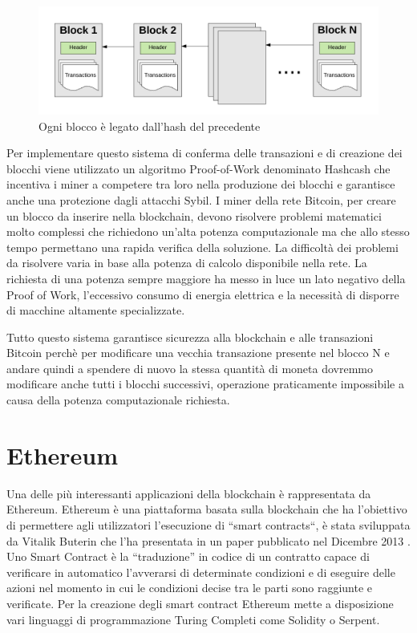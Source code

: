 \documentclass[12pt]{report}
\begin{document}
\begin{figure}[H]
    \includegraphics[width=\textwidth]{Blocks}
    \caption{Ogni blocco è legato dall'hash del precedente}
\end{figure}

Per implementare questo sistema di conferma delle transazioni e di creazione dei blocchi viene utilizzato un algoritmo Proof-of-Work denominato Hashcash che incentiva i miner a competere tra loro nella produzione dei blocchi e garantisce anche una protezione dagli attacchi Sybil.
I miner della rete Bitcoin, per creare un blocco da inserire nella blockchain, devono risolvere problemi matematici molto complessi che richiedono un'alta potenza computazionale ma che allo stesso tempo permettano una rapida verifica della soluzione.
La difficoltà dei problemi da risolvere varia in base alla potenza di calcolo disponibile nella rete. La richiesta di una potenza sempre maggiore ha messo in luce un lato negativo della Proof of Work, l'eccessivo consumo di energia elettrica e la necessità di disporre di macchine altamente specializzate.

Tutto questo sistema garantisce sicurezza alla blockchain e alle transazioni Bitcoin perchè per modificare una vecchia transazione presente nel blocco N e andare quindi a spendere di nuovo la stessa quantità di moneta dovremmo modificare anche tutti i blocchi successivi, operazione praticamente impossibile a causa della potenza computazionale richiesta.


\section{Ethereum}

Una delle più interessanti applicazioni della blockchain è rappresentata da Ethereum.
\newline
Ethereum è una piattaforma basata sulla blockchain che ha l'obiettivo di permettere agli utilizzatori l'esecuzione di ``smart contracts``, è stata sviluppata da Vitalik Buterin che l'ha presentata in un paper pubblicato nel Dicembre 2013 \cite{ethereumWhitePaper}.
Uno Smart Contract è la “traduzione” in codice di un contratto capace di verificare in automatico l’avverarsi di determinate condizioni e di eseguire delle azioni nel momento in cui le condizioni decise tra le parti sono raggiunte e verificate.
Per la creazione degli smart contract Ethereum mette a disposizione vari linguaggi di programmazione Turing Completi come Solidity o Serpent.
\end{document}

